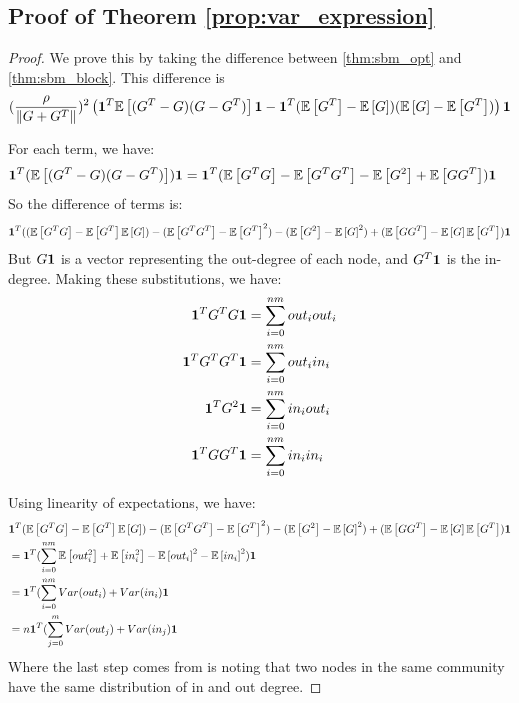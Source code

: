 \subsection{Proof of Theorem \ref{prop:var_expression}}
\begin{proof}
    We prove this by taking the difference between \ref{thm:sbm_opt} and \ref{thm:sbm_block}. This difference is 
    \begin{equation}
        (\frac{\rho}{\|G+G^T\|})^2 \left(\mathbf{1}^T \mathbb{E}\left[ (G^T -G)(G-G^T)\right] \mathbf{1} - \mathbf{1}^T ( \mathbb{E}\left[G^T\right] - \mathbb{E}\left[G\right])(\mathbb{E}\left[G\right]-\mathbb{E}\left[G^T\right]) \right)  \mathbf{1} 
    \end{equation}

    For each term, we have:
    \begin{align*}
        \mathbf{1}^T (\mathbb{E}\left[ (G^T -G)(G-G^T)\right] )\mathbf{1}  &= \mathbf{1}^T (\mathbb{E}\left[G^T G\right] - \mathbb{E}\left[G^T G^T\right] - \mathbb{E}\left[G^2\right] + \mathbb{E}\left[G G^T\right]) \mathbf{1}  
    \end{align*}
    So the difference of terms is:
    \begin{align*}
        \mathbf{1}^T ( (\mathbb{E}\left[G^T G\right] - \mathbb{E}\left[G^T\right]\mathbb{E}\left[G\right]) - (\mathbb{E}\left[G^T G^T\right]-\mathbb{E}\left[G^T\right]^2) - (\mathbb{E}\left[G^2\right]-\mathbb{E}\left[G\right]^2) + (\mathbb{E}\left[G G^T\right] - \mathbb{E}\left[G\right]\mathbb{E}\left[G^T\right]) \mathbf{1} \\
    \end{align*}
    But $G \mathbf{1}$ is a vector representing the out-degree of each node, and $G^T \mathbf{1}$ is the in-degree. Making these substitutions, we have: 
    \begin{align*}
        \mathbf{1}^T  G^T G \mathbf{1} &= \sum_{i=0}^{nm} out_i out_i \\ 
        \mathbf{1}^T G^T G^T \mathbf{1} &= \sum_{i=0}^{nm} out_i in_i \\
        \mathbf{1}^T G^2 \mathbf{1} &= \sum_{i=0}^{nm} in_i out_i \\
        \mathbf{1}^T G G^T \mathbf{1} &= \sum_{i=0}^{nm} in_i in_i \\
    \end{align*}

    Using linearity of expectations, we have:
    \begin{align*}
         &\mathbf{1}^T  (\mathbb{E}\left[G^T G\right] - \mathbb{E}\left[G^T\right]\mathbb{E}\left[G\right]) - (\mathbb{E}\left[G^T G^T\right]-\mathbb{E}\left[G^T\right]^2) - (\mathbb{E}\left[G^2\right]-\mathbb{E}\left[G\right]^2) + (\mathbb{E}\left[G G^T\right] - \mathbb{E}\left[G\right]\mathbb{E}\left[G^T\right]) \mathbf{1} \\
         &=\mathbf{1}^T (\sum_{i=0}^{nm} \mathbb{E}\left[out_i^2 \right] + \mathbb{E}\left[in_i^2\right] - \mathbb{E}\left[out_i\right]^2 - \mathbb{E}\left[in_i\right]^2 ) \mathbf{1}\\ 
          &=\mathbf{1}^T (\sum_{i=0}^{nm} Var(out_i) + Var(in_i ) \mathbf{1} \\ 
          &= n \mathbf{1}^T (\sum_{j=0}^m  Var(out_j) + Var(in_j) \mathbf{1}
    \end{align*}
    Where the last step comes from is noting that two nodes in the same community have the same distribution of in and out degree. 
\end{proof} 

